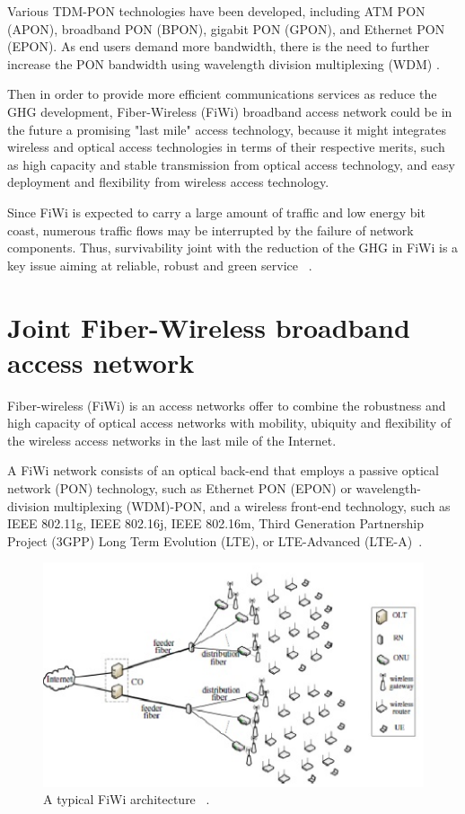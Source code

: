 \documentclass[conference,compsoc]{IEEEtran}
\begin{document}
Various TDM-PON technologies have been developed, including ATM PON (APON), broadband PON (BPON), 
gigabit PON (GPON), and Ethernet PON (EPON). As end users demand more bandwidth, there is the need 
to further increase the PON bandwidth using wavelength division multiplexing (WDM) \cite{5759821}.

Then in order to provide more efficient communications services as reduce the GHG development, Fiber-Wireless (FiWi) broadband access network could be in the future a promising "last mile" access technology, because it might integrates wireless and optical access technologies in terms of their respective merits, such as high capacity and stable transmission from optical access technology, and easy deployment and flexibility from wireless access technology. 

Since FiWi is expected to carry a large amount of traffic and low energy bit coast, numerous traffic flows may be interrupted by the failure of network components. Thus, survivability  joint with the reduction of the GHG in FiWi is a key issue aiming at reliable, robust  and green service ~\cite{Liu201268}.



\section{Joint Fiber-Wireless broadband access network}
Fiber-wireless (FiWi) is an access networks offer to combine the robustness and 
high capacity of optical access networks with mobility, ubiquity and 
flexibility of the wireless access networks in the last mile of the Internet.

A FiWi network consists of an optical back-end that employs a passive optical network 
(PON) technology, such as Ethernet PON (EPON) or wavelength-division multiplexing (WDM)-PON, and a 
wireless front-end technology, such as
IEEE 802.11g, IEEE 802.16j, IEEE 802.16m, Third Generation
Partnership Project (3GPP) Long Term Evolution (LTE), or LTE-Advanced 
(LTE-A)~\cite{4785396}.

\begin{figure}[H]
 	\includegraphics[width=\linewidth]{fiwi.eps}
 	\caption{A typical FiWi architecture ~\cite{Liu201268}.}
 	\label{fig:fiwi_arch}
\end{figure}
\end{document}
